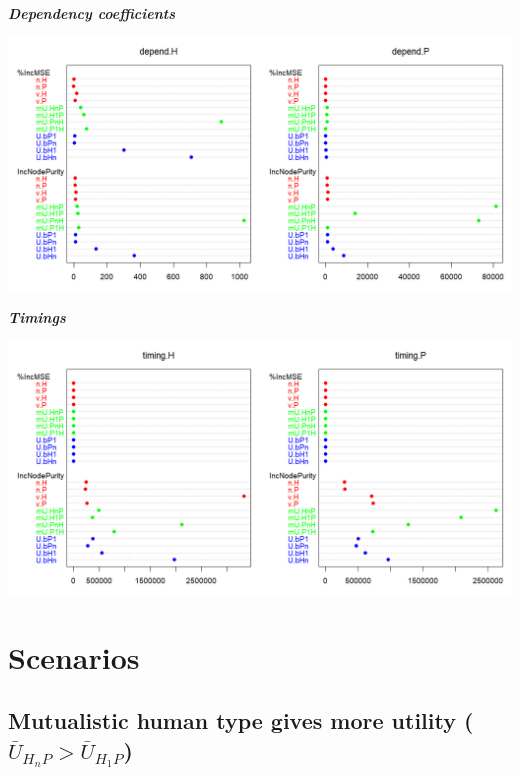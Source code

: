 \documentclass[]{book}
\begin{document}
\newpage

\textbf{\emph{Dependency coefficients}}

\includegraphics[width=1\linewidth]{plots/5_multiplePar-rf-depend}

\textbf{\emph{Timings}}

\includegraphics[width=1\linewidth]{plots/5_multiplePar-rf-timing}

\newpage

\hypertarget{scenarios}{%
\section{Scenarios}\label{scenarios}}

\hypertarget{mutualistic-human-type-gives-more-utility-baru_h_np-baru_h_1p}{%
\subsection{\texorpdfstring{Mutualistic human type gives more utility (\(\bar{U}_{H_{n}P}> \bar{U}_{H_{1}P}\))}{Mutualistic human type gives more utility (\textbackslash{}bar\{U\}\_\{H\_\{n\}P\}\textgreater{} \textbackslash{}bar\{U\}\_\{H\_\{1\}P\})}}\label{mutualistic-human-type-gives-more-utility-baru_h_np-baru_h_1p}}
\end{document}
